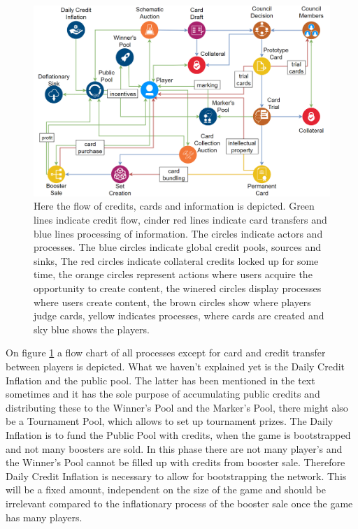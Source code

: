 \documentclass{article}
\begin{document}
\begin{figure}[ht]
	\centering
	\includegraphics[width=1\textwidth]{flow.png}
	\caption{Here the flow of credits, cards and information is depicted. \textcolor{boringgreen}{Green} lines indicate credit flow, \textcolor{boringred}{cinder red} lines indicate card transfers and \textcolor{boringblue}{blue} lines processing of information. The circles indicate actors and processes. The \textcolor{awesomeblue}{blue} circles indicate global credit pools, sources and sinks, The \textcolor{awesomered}{red} circles indicate collateral credits locked up for some time, the \textcolor{awesomeorange}{orange} circles represent actions where users acquire the opportunity to create content, the \textcolor{awesomewinered}{winered} circles display processes where users create content, the \textcolor{awesomebrown}{brown} circles show where players judge cards, \textcolor{awesomeyellow}{yellow} indicates processes, where cards are created and \textcolor{awesomeskyblue}{sky blue} shows the players.
	}
	\label{fig1}
\end{figure}
%
On figure \ref{fig1} a flow chart of all processes except for card and credit transfer between players is depicted. What we haven't explained yet is the Daily Credit Inflation and the public pool. The latter has been mentioned in the text sometimes and it has the sole purpose of accumulating public credits and distributing these to the Winner's Pool and the Marker's Pool, there might also be a Tournament Pool, which allows to set up tournament prizes. The Daily Inflation is to fund the Public Pool with credits, when the game is bootstrapped and not many boosters are sold. In this phase there are not many player's and the Winner's Pool cannot be filled up with credits from booster sale. Therefore Daily Credit Inflation is necessary to allow for bootstrapping the network. This will be a fixed amount, independent on the size of the game and should be irrelevant compared to the inflationary process of the booster sale once the game has many players. 
\end{document}
